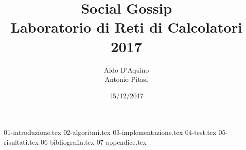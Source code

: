 \documentclass{article}
\title{Social Gossip \\
\large Laboratorio di Reti di Calcolatori 2017
}
\author{Aldo D'Aquino \\ Antonio Pitasi}
\date{15/12/2017}
\begin{document}
\maketitle

{01-introduzione.tex}
{02-algoritmi.tex}
{03-implementazione.tex}
{04-test.tex}
{05-risultati.tex}
{06-bibliografia.tex}
{07-appendice.tex}
\end{document}
